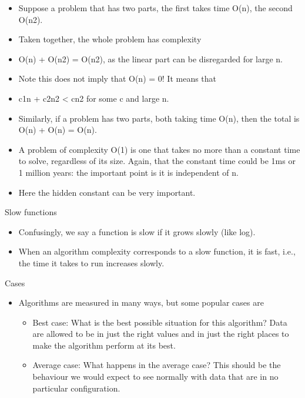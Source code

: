 \documentclass{beamer}
\begin{document}
\begin{frame}
\begin{itemize}
\item Suppose a problem that has two parts, the first takes time O(n), the second O(n2).
\item Taken together, the whole problem has complexity
\item O(n) + O(n2) = O(n2), as the linear part can be disregarded for large n.
\item Note this does not imply that O(n) = 0! It means that
\item c1n + c2n2 {\textless} cn2 for some c and large n.
\item Similarly, if a problem has two parts, both taking time O(n), then the total is O(n) + O(n) = O(n).
\item A problem of complexity O(1) is one that takes no more than a constant time to solve, regardless of its size.
Again, that the constant time could be 1ms or 1 million years: the important point is it is independent of n. 
\item Here the hidden constant can be very important.
\end{itemize}

\end{frame} \begin{frame}

Slow functions

\begin{itemize}
\item Confusingly, we say a function is slow if it grows slowly (like log).
\item When an algorithm complexity corresponds to a slow function, it is fast, i.e., the time it takes to run increases
slowly.
\end{itemize} 

\end{frame} \begin{frame}
Cases

\begin{itemize}
\item Algorithms are measured in many ways, but some popular cases are

\begin{itemize}
\item Best case: What is the best possible situation for this algorithm? Data are allowed to be in just the right values
and in just the right places to make the algorithm perform at its best.
\item Average case: What happens in the average case? This should be the behaviour we would expect to see normally with
data that are in no particular configuration.
\end{itemize}
\end{itemize}


\end{frame}
\end{document}
